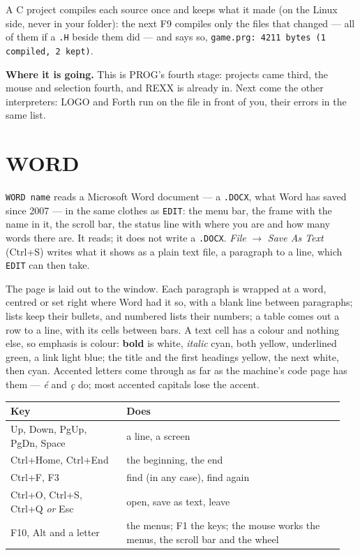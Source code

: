 A C project compiles each source once and keeps what it made (on the
Linux side, never in your folder): the next F9 compiles only the files
that changed --- all of them if a \texttt{.H} beside them did --- and says
so, \texttt{game.prg: 4211 bytes (1 compiled, 2 kept)}.

\begin{aside}
\textbf{Where it is going.} This is PROG's fourth stage: projects came
third, the mouse and selection fourth, and REXX is already in. Next come
the other interpreters: LOGO and
Forth run on the file in front of you, their errors in the same
list.
\end{aside}

\section{WORD}\label{sec:word}
\verb|WORD name| reads a Microsoft Word document --- a \texttt{.DOCX}, what
Word has saved since 2007 --- in the same clothes as \verb|EDIT|: the menu
bar, the frame with the name in it, the scroll bar, the status line with
where you are and how many words there are. It reads; it does not write a
\texttt{.DOCX}. \emph{File} $\rightarrow$ \emph{Save As Text} (Ctrl+S)
writes what it shows as a plain text file, a paragraph to a line, which
\verb|EDIT| can then take.

The page is laid out to the window. Each paragraph is wrapped at a word,
centred or set right where Word had it so, with a blank line between
paragraphs; lists keep their bullets, and numbered lists their numbers;
a table comes out a row to a line, with its cells between bars. A text
cell has a colour and nothing else, so emphasis is colour: \textbf{bold}
is white, \emph{italic} cyan, both yellow, underlined green, a link light
blue; the title and the first headings yellow, the next white, then cyan.
Accented letters come through as far as the machine's code page has them
--- \emph{é} and \emph{ç} do; most accented capitals lose the accent.

\begin{center}
\small
\begin{tabular}{@{}>{\raggedright\arraybackslash}p{0.33\linewidth} >{\raggedright\arraybackslash}p{0.62\linewidth}@{}}
\toprule
\textbf{Key} & \textbf{Does} \\
\midrule
Up, Down, PgUp, PgDn, Space & a line, a screen \\
Ctrl+Home, Ctrl+End & the beginning, the end \\
Ctrl+F, F3 & find (in any case), find again \\
Ctrl+O, Ctrl+S, Ctrl+Q \emph{or} Esc & open, save as text, leave \\
F10, Alt and a letter & the menus; F1 the keys; the mouse works the menus, the scroll bar and the wheel \\
\bottomrule
\end{tabular}
\end{center}

